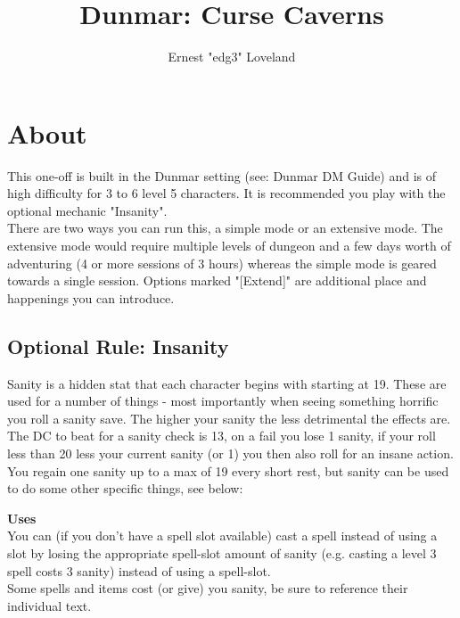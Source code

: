 \documentclass[10pt,twoside,twocolumn]{article}
\title{Dunmar: Curse Caverns}
\author{Ernest "edg3" Loveland}
\begin{document}
\selectfont %

\maketitle
\tableofcontents


\section{About}
This one-off is built in the Dunmar setting (see: Dunmar DM Guide) and is of high difficulty for 3 to 6 level 5 characters. It is recommended you play with the optional mechanic "Insanity". \\

There are two ways you can run this, a simple mode or an extensive mode. The extensive mode would require multiple levels of dungeon and a few days worth of adventuring (4 or more sessions of 3 hours) whereas the simple mode is geared towards a single session. Options marked "[Extend]" are additional place and happenings you can introduce.

\subsection{Optional Rule: Insanity}
Sanity is a hidden stat that each character begins with starting at 19. These are used for a number of things - most importantly when seeing something horrific you roll a sanity save. The higher your sanity the less detrimental the effects are. The DC to beat for a sanity check is 13, on a fail you lose 1 sanity, if your roll less than 20 less your current sanity (or 1) you then also roll for an insane action. \\

You regain one sanity up to a max of 19 every short rest, but sanity can be used to do some other specific things, see below: \\

\begin{dndtable}
   	\textbf{Uses}  \\
   	You can (if you don't have a spell slot available) cast a spell instead of using a slot by losing the appropriate spell-slot amount of sanity (e.g. casting a level 3 spell costs 3 sanity) instead of using a spell-slot. \\
   	Some spells and items cost (or give) you sanity, be sure to reference their individual text.
\end{dndtable}
\end{document}
